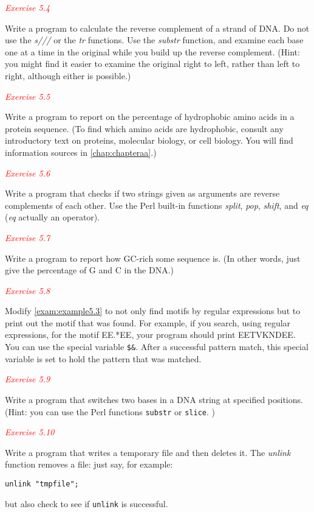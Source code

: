 \textcolor{red}{\textit{Exercise 5.4}}
\begin{adjustwidth}{1cm}{}
Write a program to calculate the reverse complement of a strand of DNA. Do not use the \textit{s///} or the \textit{tr} functions. Use the \textit{substr} function, and examine each base one at a time in the original while you build up the reverse complement. (Hint: you might find it easier to examine the original right to left, rather than left to right, although either is possible.) 
\end{adjustwidth}

\textcolor{red}{\textit{Exercise 5.5}}
\begin{adjustwidth}{1cm}{}
Write a program to report on the percentage of hydrophobic amino acids in a protein sequence. (To find which amino acids are hydrophobic, consult any introductory text on proteins, molecular biology, or cell biology. You will find information sources in \autoref{chap:chapteraa}.) 
\end{adjustwidth}

\textcolor{red}{\textit{Exercise 5.6}}
\begin{adjustwidth}{1cm}{}
Write a program that checks if two strings given as arguments are reverse complements of each other. Use the Perl built-in functions \textit{split}, \textit{pop}, \textit{shift}, and \textit{eq} (\textit{eq} actually an operator). 
\end{adjustwidth}

\textcolor{red}{\textit{Exercise 5.7}}
\begin{adjustwidth}{1cm}{}
Write a program to report how GC-rich some sequence is. (In other words, just give the percentage of G and C in the DNA.)
\end{adjustwidth}

\textcolor{red}{\textit{Exercise 5.8}}
\begin{adjustwidth}{1cm}{}
Modify \autoref{exam:example5.3} to not only find motifs by regular expressions but to print out the motif that was found. For example, if you search, using regular expressions, for the motif EE.*EE, your program should print EETVKNDEE. You can use the special variable \verb|$&|. After a successful pattern match, this special variable is set to hold the pattern that was matched. 
\end{adjustwidth}

\textcolor{red}{\textit{Exercise 5.9}}
\begin{adjustwidth}{1cm}{}
Write a program that switches two bases in a DNA string at specified positions. (Hint: you can use the Perl functions \verb|substr| or \verb|slice|. )
\end{adjustwidth}

\textcolor{red}{\textit{Exercise 5.10}}
\begin{adjustwidth}{1cm}{}
Write a program that writes a temporary file and then deletes it. The \textit{unlink} function removes a file: just say, for example:
\begin{lstlisting}
unlink "tmpfile";
\end{lstlisting}
but also check to see if \verb|unlink| is successful.
\end{adjustwidth}
